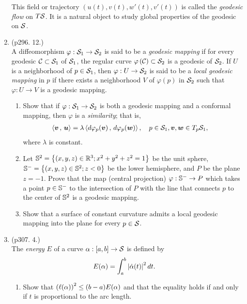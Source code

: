 \documentclass[11pt]{article}
\begin{document}
\begin{enumerate}
\begin{example}
This field or trajectory $(u(t), v(t), w'(t), v'(t))$ is called the \emph{geodesic flow} on $T{\mathcal S}$. It is a natural object to study global properties of the geodesic on ${\mathcal S}$.
\end{example}


\item  \begin{example} \citep{do1976differential} (p296. 12.)\\
A diffeomorphism $\varphi: {\mathcal S}_{1} \rightarrow {\mathcal S}_{2}$ is said to be a \emph{geodesic mapping} if for every geodesic ${\mathcal C}\subset {\mathcal S}_{1}$ of ${\mathcal S}_{1}$, the regular curve $\varphi\left({\mathcal C}\right) \subset {\mathcal S}_{2}$ is a geodesic of ${\mathcal S}_{2}$. If $U$ is a neighborhood of $p\in {\mathcal S}_{1}$, then $\varphi: U \rightarrow {\mathcal S}_{2}$ is said to be a \emph{local geodesic mapping} in $p$ if there exists a neighborhood $V$ of $\varphi(p)$ in ${\mathcal S}_{2}$ such that $\varphi: U\rightarrow V$ is a geodesic mapping. 
\begin{enumerate}
\item Show that if $\varphi: {\mathcal S}_{1} \rightarrow {\mathcal S}_{2}$ is both a geodesic mapping and a conformal mapping, then $\varphi$ is a \emph{similarity};  that is,
\begin{align*}
\left\langle \boldsymbol{v}\,,\, \boldsymbol{u} \right\rangle &= \lambda\left\langle d\varphi_{p}(\boldsymbol{v})\,,\, d\varphi_{p}(\boldsymbol{w}) \right\rangle, \quad p\in {\mathcal S}_{1}, \boldsymbol{v},\boldsymbol{w} \in T_{p}{\mathcal S}_{1},
\end{align*}
where $\lambda$ is constant.  

\item Let ${\mathbb S}^{2} = \left\{(x,y,z) \in {\mathbb R}^{3}; x^{2}+ y^{2}+ z^{2} = 1\right\}$ be the unit sphere, ${\mathbb S}^{-} = \left\{(x,y,z) \in {\mathbb S}^{2}; z < 0\right\}$ be the lower hemisphere, and $P$ be the plane $z=-1$. Prove that the map (central projection) $\varphi: {\mathbb S}^{-} \rightarrow P$ which takes a point $p\in {\mathbb S}^{-}$ to the intersection of $P$ with the line that connects $p$ to the center of ${\mathbb S}^{2}$ is a geodesic mapping. 

\item Show that a surface of constant curvature admits a local geodesic mapping into the plane for every $p\in {\mathcal S}$.
\end{enumerate}
\end{example}

\item \begin{example}\citep{do1976differential} (p307. 4.)\\
The \emph{energy} $E$ of a curve $\alpha: [a,b] \rightarrow {\mathcal S}$ is defined by 
\begin{align*}
E(\alpha) &= \int_{a}^{b}\left\lvert \dot{\alpha}(t) \right\rvert^{2}dt.
\end{align*}
\begin{enumerate}
\item Show that $\left(\ell(\alpha)\right)^{2} \le (b-a)E(\alpha)$ and that the equality holds if and only if $t$ is proportional to the arc length. 


\end{enumerate}
\end{example}
\end{enumerate}
\end{document}
